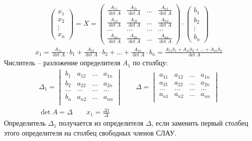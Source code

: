 \begin{gather*}
\begin{pmatrix} x_1 \\ x_2 \\ \vdots \\ x_n \end{pmatrix} = X = \begin{pmatrix}
\frac{A_{11}}{\det A} & \frac{A_{21}}{\det A} & \ldots & \frac{A_{n1}}{\det A} \\[1ex]
\frac{A_{12}}{\det A} & \frac{A_{22}}{\det A} & \ldots & \frac{A_{n2}}{\det A} \\[1ex]
\ldots & \ldots & \ldots & \ldots\\[1ex]
\frac{A_{1n}}{\det A} & \frac{A_{2n}}{\det A} & \ldots & \frac{A_{nn}}{\det A}
\end{pmatrix} \cdot \begin{pmatrix}
b_1\\
b_2\\
\vdots\\
b_n
\end{pmatrix}
\end{gather*}
\begin{gather*}
x_1 = \frac{A_{11}}{\det A} \cdot b_1 + \frac{A_{21}}{\det A} \cdot b_2 + \ldots + \frac{A_{n1}}{\det A} \cdot b_n = \frac{A_{11}b_1 + A_{21}b_2 + \ldots + A_{n1}b_n}{\det A}
\end{gather*}
Числитель -- разложение определителя $A_1$ по столбцу: 
\begin{gather*}
\Delta_1 = \begin{vmatrix}
b_1 & a_{12} & \ldots & a_{1n} \\
b_2 & a_{22} & \ldots & a_{2n} \\
\ldots & \ldots & \ldots & \ldots \\
b_n & a_{n2} & \ldots & a_{nn} \\
\end{vmatrix}\qquad \Delta = \begin{vmatrix}
a_{11} & a_{12} & \ldots & a_{1n} \\
a_{21} & a_{22} & \ldots & a_{2n} \\
\ldots & \ldots & \ldots & \ldots \\
a_{n1} & a_{n2} & \ldots & a_{nn} \\
\end{vmatrix}\\
\det A = \Delta\qquad x_1 = \frac{\Delta 1}{\Delta}
\end{gather*}
Определитель $\Delta_1$ получается из определителя $\Delta$, если заменить первый столбец этого определителя на столбец свободных членов СЛАУ.
